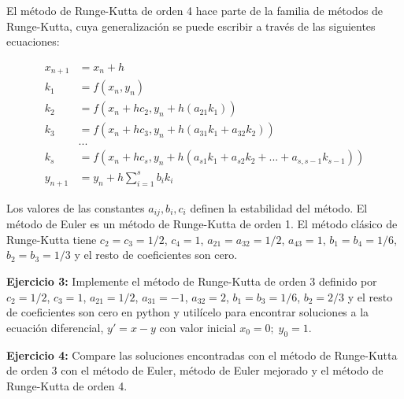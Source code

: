 \documentclass[10.5pt]{article}
\begin{document}
El método de Runge-Kutta de orden 4 hace parte de la familia de métodos de Runge-Kutta, cuya generalización se puede escribir a través de las siguientes ecuaciones:

\begin{align}
  x_{n+1} & =  x_{n}+h \\
  k_{1} & =  f(x_{n},y_{n}) \\
  k_{2} & =  f(x_{n}+hc_{2},y_{n}+h(a_{21}k_{1})) \\
  k_{3} & =  f(x_{n}+hc_{3},y_{n}+h(a_{31}k_{1}+a_{32}k_{2})) \\
  & ... \\
  k_{s} & =  f(x_{n}+hc_{s},y_{n}+h(a_{s1}k_{1}+a_{s2}k_{2}+...+a_{s,s-1}k_{s-1})) \\
  y_{n+1} & =  y_{n} + h\sum_{i=1}^{s}b_{i}k_{i}
\end{align}

Los valores de las constantes $a_{ij},b_{i},c_{i}$ definen la estabilidad del método. El método de Euler es un método de Runge-Kutta de orden 1. El método clásico de Runge-Kutta tiene $c_{2}=c_{3}=1/2$, $c_{4}=1$, $a_{21}=a_{32}=1/2$, $a_{43}=1$, $b_{1}=b_{4}=1/6$, $b_{2}=b_{3}=1/3$ y el resto de coeficientes son cero.

{\bf Ejercicio 3:} Implemente el método de Runge-Kutta de orden 3 definido por $c_{2}=1/2$, $c_{3}=1$, $a_{21}=1/2$, $a_{31}=-1$, $a_{32}=2$, $b_{1}=b_{3}=1/6$, $b_{2}=2/3$ y el resto de coeficientes son cero en python y utilícelo para encontrar soluciones a la ecuación diferencial, $y'=x-y$ con valor inicial $x_{0}=0;\; y_{0}=1$.

{\bf Ejercicio 4:} Compare las soluciones encontradas con el método de Runge-Kutta de orden 3 con el método de Euler, método de Euler mejorado y el método de Runge-Kutta de orden 4.


%
\end{document}
